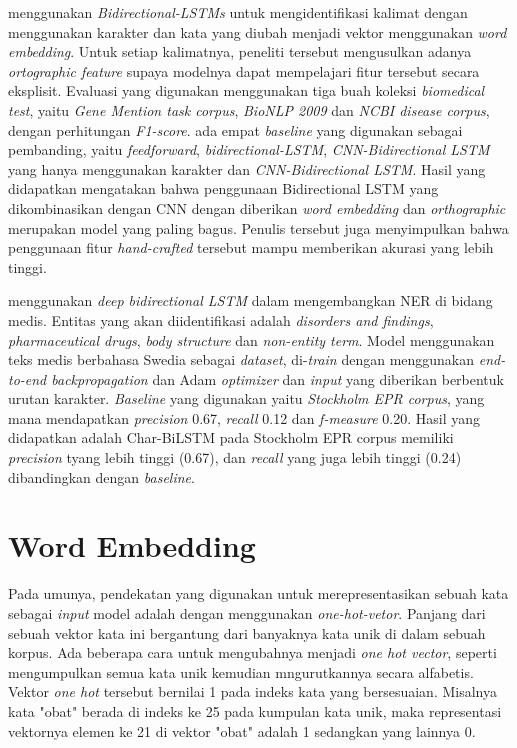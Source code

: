 \cite{limsopatham2016learning} menggunakan \textit{Bidirectional-LSTMs} untuk mengidentifikasi kalimat dengan menggunakan karakter dan kata yang diubah menjadi vektor menggunakan \textit{word embedding}. Untuk setiap kalimatnya, peneliti tersebut mengusulkan adanya \textit{ortographic feature} supaya modelnya dapat mempelajari fitur tersebut secara eksplisit. Evaluasi yang digunakan menggunakan tiga buah koleksi \textit{biomedical test}, yaitu \textit{Gene Mention task corpus}, \textit{BioNLP 2009} dan \textit{NCBI disease corpus}, dengan perhitungan \textit{F1-score}. ada empat \textit{baseline} yang digunakan sebagai pembanding, yaitu \textit{feedforward}, \textit{bidirectional-LSTM}, \textit{CNN-Bidirectional LSTM} yang hanya menggunakan karakter dan \textit{CNN-Bidirectional LSTM}. Hasil yang didapatkan mengatakan bahwa penggunaan Bidirectional LSTM yang dikombinasikan dengan CNN dengan diberikan \textit{word embedding} dan \textit{orthographic} merupakan model yang paling bagus. Penulis tersebut juga menyimpulkan bahwa penggunaan fitur \textit{hand-crafted} tersebut mampu memberikan akurasi yang lebih tinggi.

\cite{almgren2016named} menggunakan \textit{deep bidirectional LSTM} dalam mengembangkan NER di bidang medis. Entitas yang akan diidentifikasi adalah \textit{disorders and findings}, \textit{pharmaceutical drugs}, \textit{body structure} dan \textit{non-entity term}. Model menggunakan teks medis berbahasa Swedia sebagai \textit{dataset}, di-\textit{train} dengan menggunakan \textit{end-to-end backpropagation} dan Adam \textit{optimizer} dan \textit{input} yang diberikan berbentuk urutan karakter. \textit{Baseline} yang digunakan yaitu \textit{Stockholm EPR corpus}, yang mana mendapatkan \textit{precision} 0.67, \textit{recall} 0.12 dan \textit{f-measure} 0.20. Hasil yang didapatkan adalah Char-BiLSTM pada Stockholm EPR corpus memiliki \textit{precision} tyang lebih tinggi (0.67), dan \textit{recall} yang juga lebih tinggi (0.24) dibandingkan dengan \textit{baseline}.

\section{Word Embedding}
Pada umunya, pendekatan yang digunakan untuk merepresentasikan sebuah kata sebagai \textit{input} model adalah dengan menggunakan \textit{one-hot-vetor}. Panjang dari sebuah vektor kata ini bergantung dari banyaknya kata unik di dalam sebuah korpus. Ada beberapa cara untuk mengubahnya menjadi \textit{one hot vector}, seperti mengumpulkan semua kata unik kemudian mngurutkannya secara alfabetis. Vektor \textit{one hot} tersebut bernilai 1 pada indeks kata yang bersesuaian. Misalnya kata "obat" berada di indeks ke 25 pada kumpulan kata unik, maka representasi vektornya elemen ke 21 di vektor "obat" adalah 1 sedangkan yang lainnya 0.

